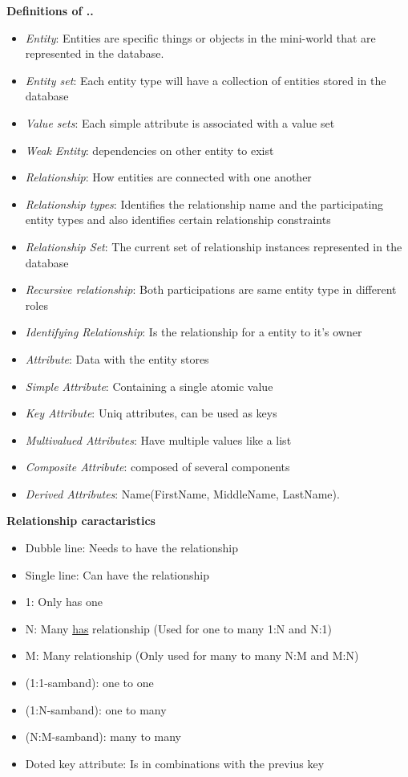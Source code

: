 \documentclass{article}
\begin{document}
\newpage
\noindent\textbf{Definitions of ..}
\begin{itemize}
    \item \textit{Entity}: Entities are specific things or objects in the 
    mini-world that are represented in the database.
    \item \textit{Entity set}: Each entity type will have a collection of entities stored in the database
    \item \textit{Value sets}: Each simple attribute is associated with a value set
    \item \textit{Weak Entity}: dependencies on other entity to exist
    \item \textit{Relationship}: How entities are connected with one another
    \item \textit{Relationship types}: Identifies the relationship name and the participating entity types and also identifies certain relationship constraints
    \item \textit{Relationship Set}: The current set of relationship instances represented in the database
    \item \textit{Recursive relationship}: Both participations are same entity type in different roles
    \item \textit{Identifying Relationship}: Is the relationship for a entity to it's owner
    \item \textit{Attribute}: Data with the entity stores
    \item \textit{Simple Attribute}: Containing a single atomic value
    \item \textit{Key Attribute}: Uniq attributes, can be used as keys
    \item \textit{Multivalued Attributes}: Have multiple values like a list
    \item \textit{Composite Attribute}: composed of several components
    \item \textit{Derived Attributes}: Name(FirstName, MiddleName, LastName).
\end{itemize}


\newpage
\noindent\textbf{Relationship caractaristics}
\begin{itemize}
    \item Dubble line: Needs to have the relationship
    \item Single line: Can have the relationship
    \item 1: Only has one
    \item N: Many \underline{has} relationship (Used for one to many 1:N and N:1)
    \item M: Many relationship (Only used for many to many N:M and M:N)
    \item (1:1-samband): one to one
    \item (1:N-samband): one to many
    \item (N:M-samband): many to many 
    \item Doted key attribute: Is in combinations with the previus key
\end{itemize}
\end{document}
